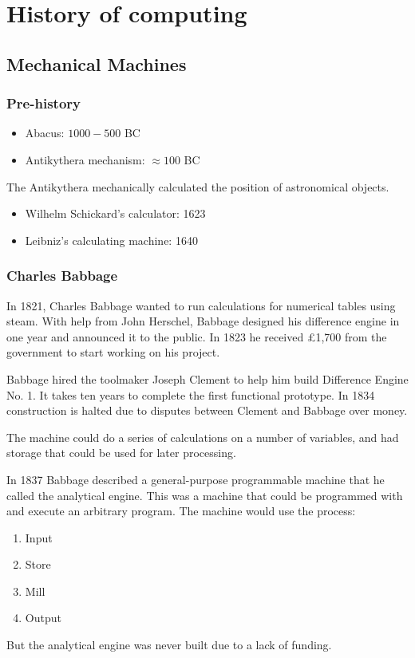 \chapter{History of computing}

\section{Mechanical Machines}
\subsection{Pre-history}
\begin{itemize}
    \item Abacus: \(1000 - 500\) BC
    \item Antikythera mechanism: \(\approx100\) BC
\end{itemize}
The Antikythera mechanically calculated the position of astronomical objects.
\begin{itemize}
    \item Wilhelm Schickard's calculator: 1623
    \item Leibniz's calculating machine: 1640
\end{itemize}

\subsection{Charles Babbage}
In 1821, Charles Babbage wanted to run calculations for numerical tables using steam. With help from John Herschel, Babbage designed his difference engine in one year and announced it to the public. In 1823 he received £1,700 from the government to start working on his project.

Babbage hired the toolmaker Joseph Clement to help him build Difference Engine No. 1. It takes ten years to complete the first functional prototype. In 1834 construction is halted due to disputes between Clement and Babbage over money.

The machine could do a series of calculations on a number of variables, and had storage that could be used for later processing.

In 1837 Babbage described a general-purpose programmable machine that he called the analytical engine. This was a machine that could be programmed with and execute an arbitrary program. The machine would use the process:
\begin{enumerate}
    \item Input
    \item Store
    \item Mill
    \item Output
\end{enumerate}
But the analytical engine was never built due to a lack of funding.

